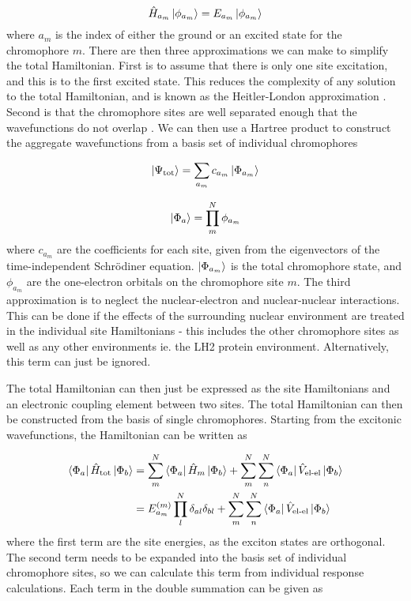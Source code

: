 \begin{equation}
\hat{H}_{a_m} \ket{\phi_{a_m}} = E_{a_m} \ket{\phi_{a_m}}
\end{equation}
%
where ${a_m}$ is the index of either the ground or an excited state for the chromophore
$m$. There are then three approximations we can make to simplify the total Hamiltonian.
First is to assume that there is only one site excitation, and this is to the first
excited state. This reduces the complexity of any solution to the total Hamiltonian,
and is known as the Heitler-London approximation \cite{Agranovich2000}. Second is 
that the chromophore sites are well separated enough that the wavefunctions do not
overlap \cite{Frenkel1931}. We can then use a Hartree product to construct the aggregate
wavefunctions from a basis set of individual chromophores

\begin{equation}
\ket{\Psi_\text{tot}} = \sum_{a_m} c_{a_m} \ket{\Phi_{a_m}}
\end{equation}

\begin{equation}
\ket{\Phi_a} = \prod^N_m \phi_{a_m}
\end{equation}
%
where $c_{a_m}$ are the coefficients for each site, given from the eigenvectors 
of the time-independent Schrödiner equation. $\ket{\Phi_{a_m}}$ is the total chromophore
state, and $\phi_{a_m}$ are the one-electron orbitals on the chromophore site $m$.
The third approximation is to neglect the nuclear-electron and nuclear-nuclear interactions.
This can be done if the effects of the surrounding nuclear environment are treated
in the individual site Hamiltonians \cite{Scholes2003} - this includes the other 
chromophore sites as well as any other environments ie. the LH2 protein environment.
Alternatively, this term can just be ignored.

The total Hamiltonian can then just be expressed as the site Hamiltonians and an 
electronic coupling element between two sites. The total Hamiltonian can then be
constructed from the basis of single chromophores. Starting from the excitonic wavefunctions,
the Hamiltonian can be written as

\begin{equation}
\begin{aligned}
\bra{\Phi_a} \hat{H}_{\text{tot}}\ket{\Phi_b} &= \sum^N_m \bra{\Phi_a} \hat{H}_{m}\ket{\Phi_b} + \sum^N_m \sum^N_n \bra{\Phi_a} \hat{V}_{\text{el-el}}\ket{\Phi_b} \\
&= E^{\left(m\right)}_{a_m} \prod^N_l \delta_{al} \delta_{bl} + \sum^N_m \sum^N_n \bra{\Phi_a} \hat{V}_{\text{el-el}}\ket{\Phi_b}
\end{aligned}
\end{equation}
%
where the first term are the site energies, as the exciton states are orthogonal. 
The second term needs to be expanded into the basis set of individual chromophore 
sites, so we can calculate this term from individual response calculations. Each 
term in the double summation can be given as

